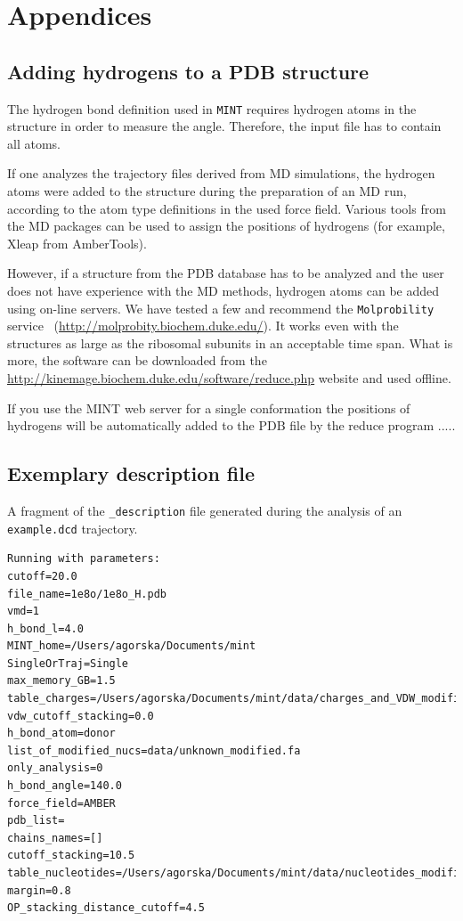 \documentclass[12pt]{article}
\begin{document}
\section{Appendices}
\begin{appendices}
\subsection{Adding hydrogens to a PDB structure}
The hydrogen bond definition used in {\tt MINT} requires hydrogen atoms in the structure in order to measure the angle. Therefore, the input file has to contain all atoms.

If one analyzes the trajectory files derived from MD simulations, the hydrogen atoms were added to the structure during the preparation of an MD run, according to the atom type definitions in the used force field. Various tools from the MD packages can be used to assign the positions of hydrogens (for example, Xleap from AmberTools). 

However, if a structure from the PDB database has to be analyzed and the user does not have experience with the MD methods, hydrogen atoms can be added using on-line servers. We have tested a few and recommend the {\tt Molprobility} service~\cite{Chen2010} (\url{http://molprobity.biochem.duke.edu/}). It works even with the structures as large as the ribosomal subunits in an acceptable time span. What is more, the software can be downloaded from the \url{http://kinemage.biochem.duke.edu/software/reduce.php} website and used offline.

{\color{red}If you use the MINT web server for a single conformation the positions of hydrogens will be automatically added to the PDB file by the reduce program .....}

\subsection{Exemplary description file}
A fragment of the \texttt{\_description} file generated during the analysis of an \texttt{example.dcd} trajectory.
\begin{scriptsize}
\begin{lstlisting}
Running with parameters: 
cutoff=20.0
file_name=1e8o/1e8o_H.pdb
vmd=1
h_bond_l=4.0
MINT_home=/Users/agorska/Documents/mint
SingleOrTraj=Single
max_memory_GB=1.5
table_charges=/Users/agorska/Documents/mint/data/charges_and_VDW_modified.csv
vdw_cutoff_stacking=0.0
h_bond_atom=donor
list_of_modified_nucs=data/unknown_modified.fa
only_analysis=0
h_bond_angle=140.0
force_field=AMBER
pdb_list=
chains_names=[]
cutoff_stacking=10.5
table_nucleotides=/Users/agorska/Documents/mint/data/nucleotides_modified.csv
margin=0.8
OP_stacking_distance_cutoff=4.5


\end{lstlisting}
\end{scriptsize}
\end{appendices}
\end{document}
